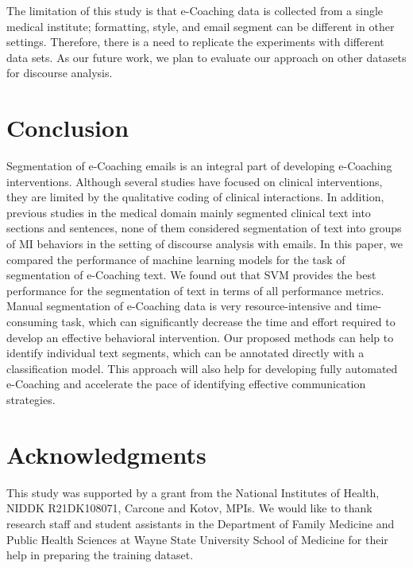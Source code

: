 \documentclass{amia}
\begin{document}
The limitation of this study is that e-Coaching data is collected from a single medical institute; formatting, style, and email segment can be different in other settings. Therefore, there is a need to replicate the experiments with different data sets. As our future work, we plan to evaluate our approach on other datasets for discourse analysis. 

 
\section*{Conclusion}
Segmentation of e-Coaching emails is an integral part of developing e-Coaching interventions. Although several studies have focused on clinical interventions, they are limited by the qualitative coding of clinical interactions. In addition, previous studies in the medical domain mainly segmented clinical text into sections and sentences, none of them considered segmentation of text into groups of MI behaviors in the setting of discourse analysis with emails. In this paper, we compared the performance of machine learning models for the task of segmentation of e-Coaching text. We found out that SVM provides the best performance for the segmentation of text in terms of all performance metrics. Manual segmentation of e-Coaching data is very resource-intensive and time-consuming task, which can significantly decrease the time and effort required to develop an effective behavioral intervention. Our proposed methods can help to identify individual text segments, which can be annotated directly with a classification model. This approach will also help for developing fully automated e-Coaching and accelerate the pace of identifying effective communication strategies.

\section*{Acknowledgments}
This study was supported by a grant from the National Institutes of Health, NIDDK R21DK108071, Carcone and Kotov, MPIs. We would like to thank research staff and student assistants in the Department of Family Medicine and Public Health Sciences at Wayne State University School of Medicine for their help in preparing the training dataset. 



\end{document}
